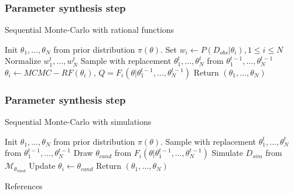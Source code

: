 \documentclass{beamer}
\begin{document}
\begin{frame}
    \frametitle{Parameter synthesis step}
    \begin{algorithm}[H]
        \caption{Sequential Monte-Carlo with rational functions}
        \label{rf-smc-alg}
        \begin{algorithmic}[1]
            \State Init $\theta_1,\ldots,\theta_N$ from prior distribution $\pi(\theta)$.
            \State Set  $w_i \leftarrow P(D_{obs}|\theta_i), 1\leq i\leq N$
            \State Normalize $w^t_1,\ldots,w^t_N$
            \State Sample with replacement $\theta^t_1,\ldots,\theta^t_N$ from $\theta^{t-1}_1,\ldots,\theta^{t-1}_N$
            \State $\theta_i \leftarrow MCMC-RF(\theta_i)$, $Q = F_i(\theta|\theta^{t-1}_1,\ldots,\theta^{t-1}_N)$
            \EndFor
            \EndFor
            \State Return $(\theta_1,\ldots,\theta_N)$
            \EndProcedure
        \end{algorithmic}
    \end{algorithm}
\end{frame}

\begin{frame}
    \frametitle{Parameter synthesis step}
    \begin{algorithm}[H]
        \caption{Sequential Monte-Carlo with simulations}
        \label{smc-abc-smc-alg}
        \begin{algorithmic}[1]
            \State Init $\theta_1,\ldots,\theta_N$ from prior distribution $\pi(\theta)$.
            \State Sample with replacement $\theta^t_1,\ldots,\theta^t_N$ from $\theta^{t-1}_1,\ldots,\theta^{t-1}_N$
            \State Draw $\theta_{cand}$ from $F_i(\theta|\theta^{t-1}_1,\ldots,\theta^{t-1}_N)$
            \State Simulate $D_{sim}$ from $\mathcal{M}_{\theta_{cand}}$
            \State Update $\theta_i \leftarrow \theta_{cand}$
            \EndIf
            \EndIf
            \EndFor
            \EndFor
            \State Return $(\theta_1,\ldots,\theta_N)$
            \EndProcedure
        \end{algorithmic}
    \end{algorithm}
\end{frame}




\begin{frame}[allowframebreaks]{References}
    \printbibliography
\end{frame}
\end{document}
